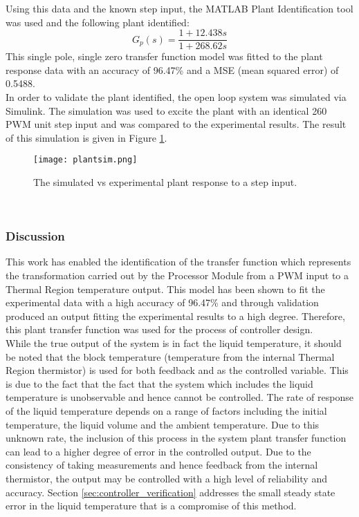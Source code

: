 Using this data and the known step input, the MATLAB Plant Identification tool was used and the following plant identified:
$$ G_p(s) = \frac{1 + 12.438s}{1 + 268.62s} $$
This single pole, single zero transfer function model was fitted to the plant response data with an accuracy of 96.47\% and a MSE (mean squared error) of 0.5488.\\

In order to validate the plant identified, the open loop system was simulated via Simulink. The simulation was used to excite the plant with an identical 260 PWM unit step input and was compared to the experimental results. The result of this simulation is given in Figure \ref{fig:plantsim]}.

\begin{figure}[!htb]
	\centering
	\texttt{[image: plantsim.png]}
	\caption[Plant validation simulation.]{The simulated vs experimental plant response to a step input.}
	\label{fig:plantsim]}
\end{figure} 
\FloatBarrier

\subsubsection{Discussion}

This work has enabled the identification of the transfer function which represents the transformation carried out by the Processor Module from a PWM input to a Thermal Region temperature output. This model has been shown to fit the experimental data with a high accuracy of 96.47\% and through validation produced an output fitting the experimental results to a high degree. Therefore, this plant transfer function was used for the process of controller design.\\

While the true output of the system is in fact the liquid temperature, it should be noted that the block temperature (temperature from the internal Thermal Region thermistor) is used for both feedback and as the controlled variable. This is due to the fact that the fact that the system which includes the liquid temperature is unobservable and hence cannot be controlled. The rate of response of the liquid temperature depends on a range of factors including the initial temperature, the liquid volume and the ambient temperature. Due to this unknown rate, the inclusion of this process in the system plant transfer function can lead to a higher degree of error in the controlled output. Due to the consistency of taking measurements and hence feedback from the internal thermistor, the output may be controlled with a high level of reliability and accuracy. Section \ref{sec:controller_verification} addresses the small steady state error in the liquid temperature that is a compromise of this method.

